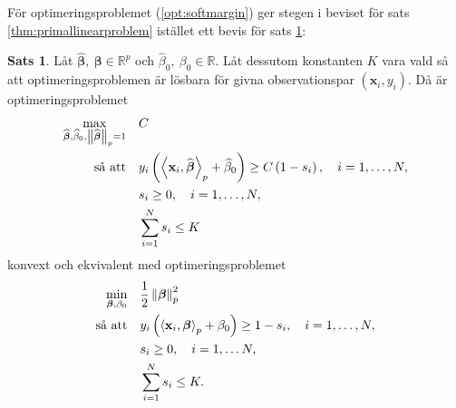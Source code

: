 \documentclass[a4paper, 12pt]{report}
\theoremstyle{definition}
\newtheorem{thm}{Sats}[section]
\newtheorem{cor}[thm]{Korollarium}
\theoremstyle{remark}
\newcommand{\bfbeta}{{\boldsymbol{\beta}}}
\newcommand{\bfx}{\mathbf{x}}
\newcommand{\llangle}{\left\langle}
\newcommand{\rrangle}{\right\rangle}
\newcommand{\inner}[2]{\llangle #1, #2 \rrangle}
\begin{document}
För optimeringsproblemet (\ref{opt:softmargin}) ger stegen i beviset för sats \ref{thm:primallinearproblem} istället ett bevis för sats \ref{thm:primalsoftmargin}:
\begin{thm}\label{thm:primalsoftmargin}
	Låt $\widehat{\bfbeta},~\bfbeta \in \mathbb{R}^p$ och $\widehat{\beta}_0,~\beta_0 \in \mathbb{R}$. Låt dessutom konstanten $K$ vara vald så att optimeringsproblemen är lösbara för givna observationspar $\left(\mathbf{x}_i,y_i\right)$. Då är optimeringsproblemet
	\begin{equation*}
	\begin{aligned}
	\operatornamewithlimits{max}_{\widehat{\bfbeta},\widehat{\beta}_0,\left\|\widehat{\bfbeta}
\right\|_p=1} & & &C\\
	\text{så att} & & &y_i\left(\inner{\bfx_i}{\widehat{\bfbeta}}_p+\widehat{\beta}_0\right)\geq C\left(1-s_i\right),\quad i=1,\dots,N,\\
	& & &s_i\geq0,\quad i=1,\dots,N,\\
	& & &\sum_{i=1}^{N}s_i \leq K
	\end{aligned}
	\end{equation*}
	konvext och ekvivalent med optimeringsproblemet %
	\begin{equation*}
	\begin{aligned}
	\operatornamewithlimits{min}_{\bfbeta,\beta_0} & & &\frac{1}{2}\left\|\bfbeta
\right\|_p^2\\
	\text{så att} & & &y_i\left(\inner{\bfx_i}{\bfbeta}_p+\beta_0\right)\geq 1 - s_i,\quad i=1,\dots,N,\\
	& & &s_i\geq0,\quad i=1,\dots N,\\
	& & &\sum_{i=1}^{N} s_i \leq K.
	\end{aligned}
	\end{equation*}
\end{thm}

\end{document}
